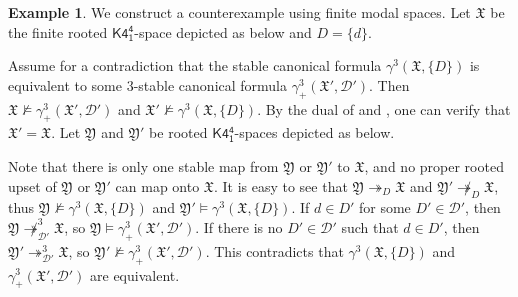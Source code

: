 \documentclass[a4paper,11pt]{article}
\theoremstyle{definition}
\newtheorem{example}[theorem]{Example}
\theoremstyle{remark}
\numberwithin{theorem}{section}
\renewcommand{\sp}[1]{\mathfrak{#1}}
\newcommand{\X}{\sp{X}}
\newcommand{\Y}{\sp{Y}}
\newcommand{\class}[1]{\mathcal{#1}}
\newcommand{\D}{\class{D}}
\newcommand{\logic}[1]{\mathsf{#1}}
\newcommand{\Kff}[2]{\logic{K4^{#1}_{#2}}}
\newcommand{\surj}{\twoheadrightarrow}
\begin{document}
\begin{example} \label{Ex m-scf}
    We construct a counterexample using finite modal spaces. Let $\X$ be the finite rooted $\Kff{4}{1}$-space depicted as below and $D = \{d\}$.
    \begin{figure}[H]
        \centering
        \end{figure}
    Assume for a contradiction that the stable canonical formula $\gamma^3(\X, \{D\})$ is equivalent to some $3$-stable canonical formula $\gamma_+^3(\X', \D')$. Then $\X \not\models \gamma_+^3(\X', \D')$ and $\X' \not\models \gamma^3(\X, \{D\})$. By the dual of  and , one can verify that $\X' = \X$. Let $\Y$ and $\Y'$ be rooted $\Kff{4}{1}$-spaces depicted as below.
    \begin{figure}[H]
        \centering
    \end{figure}
    Note that there is only one stable map from $\Y$ or $\Y'$ to $\X$, and no proper rooted upset of $\Y$ or $\Y'$ can map onto $\X$. It is easy to see that $\Y \surj_D \X$ and $\Y' \not\surj_D \X$, thus $\Y \not\models \gamma^3(\X, \{D\})$ and $\Y' \models \gamma^3(\X, \{D\})$.
    If $d \in D'$ for some $D' \in \D'$, then $\Y \not\surj^3_{\D'} \X$, so $\Y \models \gamma_+^3(\X', \D')$. If there is no $D' \in \D'$ such that $d \in D'$, then $\Y' \surj^3_{\D'} \X$, so $\Y' \not\models \gamma_+^3(\X', \D')$. This contradicts that $\gamma^3(\X, \{D\})$ and $\gamma_+^3(\X', \D')$ are equivalent. 
\end{example}
\end{document}

